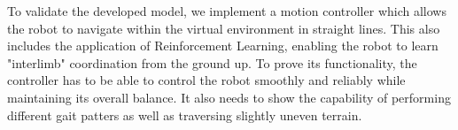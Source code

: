 To validate the developed model, we implement a motion controller which allows the robot to navigate within the virtual environment in straight lines. This also includes the application of Reinforcement Learning, enabling the robot to learn "interlimb" coordination from the ground up.
To prove its functionality, the controller has to be able to control the robot smoothly and reliably while maintaining its overall balance.
It also needs to show the capability of performing different gait patters as well as traversing slightly uneven terrain.





